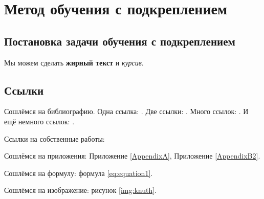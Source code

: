 \chapter{Метод обучения с подкреплением} \label{chapt1}

\section{Постановка задачи обучения с подкреплением} \label{sect1_1}

Мы можем сделать \textbf{жирный текст} и \textit{курсив}.


\section{Ссылки} \label{sect1_2}
Сошлёмся на библиографию. Одна ссылка: \cite[с.~54]{Sokolov}\cite[с.~36]{Gaidaenko}. Две ссылки: \cite{Sokolov,Gaidaenko}. Много ссылок:  \cite[с.~54]{Lermontov,Management,Borozda} \cite{Lermontov,Management,Borozda,Marketing,Constitution,FamilyCode,Gost.7.0.53,Razumovski,Lagkueva,Pokrovski,Sirotko,Lukina,Methodology,Encyclopedia,Nasirova,Berestova,Kriger}. И ещё немного ссылок: \cite{Article,Book,Booklet,Conference,Inbook,Incollection,Manual,Mastersthesis,Misc,Phdthesis,Proceedings,Techreport,Unpublished}. \cite{medvedev2006jelektronnye, CEAT:CEAT581, doi:10.1080/01932691.2010.513279,Gosele1999161,Li2007StressAnalysis, Shoji199895,test:eisner-sample,AB_patent_Pomerantz_1968,iofis_patent1960}



Ссылки на собственные работы:~\cite{vakbib1, confbib1}

Сошлёмся на приложения: Приложение \ref{AppendixA}, Приложение \ref{AppendixB2}.

Сошлёмся на формулу: формула \eqref{eq:equation1}.

Сошлёмся на изображение: рисунок \ref{img:knuth}.


